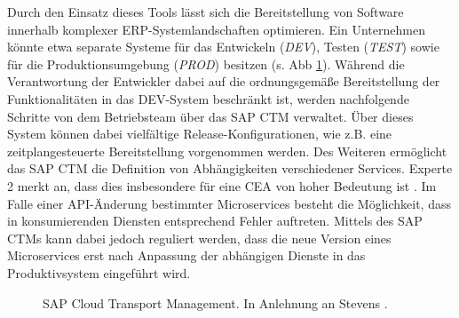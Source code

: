 Durch den Einsatz dieses Tools lässt sich die Bereitstellung von Software innerhalb komplexer ERP-Systemlandschaften optimieren. Ein Unternehmen könnte etwa separate Systeme für das Entwickeln (\textit{DEV}), Testen (\textit{TEST}) sowie für die Produktionsumgebung (\textit{PROD}) besitzen (s. Abb \ref{fig:CTM}). Während die Verantwortung der Entwickler dabei auf die ordnungsgemäße Bereitstellung der Funktionalitäten in das DEV-System beschränkt ist, werden nachfolgende Schritte von dem Betriebsteam über das SAP CTM verwaltet. Über dieses System können dabei vielfältige Release-Konfigurationen, wie z.B. eine zeitplangesteuerte Bereitstellung vorgenommen werden. Des Weiteren ermöglicht das SAP CTM die Definition von Abhängigkeiten verschiedener Services. Experte 2 merkt an, dass dies insbesondere für eine CEA von hoher Bedeutung ist \cite[Z. 67 ff.]{ProductManagerSAPHyperspaceCICD.}. Im Falle einer API-Änderung bestimmter Microservices besteht die Möglichkeit, dass in konsumierenden Diensten entsprechend Fehler auftreten. Mittels des SAP CTMs kann dabei jedoch reguliert werden, dass die neue Version eines Microservices erst nach Anpassung der abhängigen Dienste in das Produktivsystem eingeführt wird.
\begin{center}
	\begin{figure}[H]
		\centering
		\caption[SAP Cloud Transport Management]{SAP Cloud Transport Management. In Anlehnung an Stevens \cite{.20230327}.}
		\label{fig:CTM}
	\end{figure}
\end{center}
\vspace*{-15mm}
